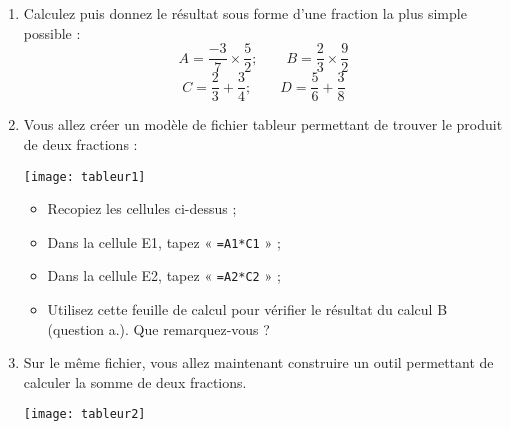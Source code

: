 \begin{TP}

\begin{enumerate}
    \item Calculez puis donnez le résultat sous forme d'une fraction la plus simple possible :
    \[ A = \dfrac{-3}{7} \times \dfrac{5}{2} ; \qquad	B = \dfrac{2}{3} \times \dfrac{9}{2} \]
    \[ C = \dfrac{2}{3} + \dfrac{3}{4} ; \qquad    D = \dfrac{5}{6} + \dfrac{3}{8} \]
    \item Vous allez créer un modèle de fichier tableur permettant de trouver le produit de deux fractions :
    
    \begin{center}
        \texttt{[image: tableur1]}
    \end{center}
    
    \begin{itemize}
        \item Recopiez les cellules ci-dessus ;
        \item Dans la cellule E1, tapez « \texttt{=A1*C1} » ;
        \item Dans la cellule E2, tapez « \texttt{=A2*C2} » ;
        \item Utilisez cette feuille de calcul pour vérifier le résultat du calcul B (question a.). Que remarquez-vous ?
    \end{itemize}
    
    \item Sur le même fichier, vous allez maintenant construire un outil permettant de calculer la somme de deux fractions.
    
    \begin{center}
        \texttt{[image: tableur2]}
    \end{center}
    

\end{enumerate}
\end{TP}
